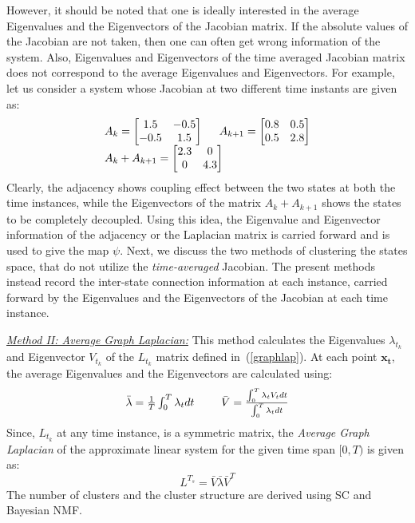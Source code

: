 However, it should be noted that one is ideally interested in the average Eigenvalues and the Eigenvectors of the Jacobian matrix. If the absolute values of the Jacobian are not taken, then one can often get wrong information of the system. Also, Eigenvalues and Eigenvectors of the time averaged Jacobian matrix does not correspond to the average Eigenvalues and Eigenvectors. For example, let us consider a system whose Jacobian at two different time instants are given as: 
\begin{equation}
\begin{array}{l}
A_{k} = \begin{bmatrix}
1.5 & -0.5 \\ -0.5 & 1.5
\end{bmatrix}
\hspace{5mm} A_{k+1} = \begin{bmatrix}
0.8 & 0.5 \\ 0.5 & 2.8
\end{bmatrix} \\
A_{k} + A_{k+1} = \begin{bmatrix}
2.3 & 0 \\ 0 & 4.3
\end{bmatrix}
\end{array}
\end{equation}
Clearly, the adjacency shows coupling effect between the two states at both the time instances, while the Eigenvectors of the matrix $A_k + A_{k+1}$ shows the states to be completely decoupled. Using this idea, the Eigenvalue and Eigenvector information of the adjacency or the Laplacian matrix is carried forward and is used to 
give the map $\psi$. Next, we discuss the two methods of clustering the states space, that do not utilize the \textit{time-averaged} Jacobian. The present methods instead record the inter-state connection information at each instance, carried forward by the Eigenvalues and the Eigenvectors of the Jacobian at each time instance.

\underline{\textit{Method II: Average Graph Laplacian:}} This method calculates the Eigenvalues $\lambda_{t_k}$ and Eigenvector $V_{t_k}$ of the $L_{t_k}$ matrix defined in~(\ref{graphlap}). At each point $\mathbf{x_t}$, the average Eigenvalues and the Eigenvectors are calculated using:
\begin{equation}
\begin{array}{cc}
\bar{\lambda} = \frac{1}{T} \int_{0}^{T} \lambda_t dt & \hspace{5 mm} \bar{V} = \frac{\int_{0}^{T} \lambda_t V_t dt}{\int_{0}^{T} \lambda_t dt} 
\end{array}
\end{equation}
Since, $L_{t_k}$ at any time instance, is a symmetric matrix, the \textit{Average Graph Laplacian} of the approximate linear system for the given time span $[0,T)$ is given as:
\begin{equation}
L^{T_s} = \bar{V} \bar{\lambda} \bar{V}^T
\end{equation}
The number of clusters and the cluster structure are derived using SC and Bayesian NMF.

